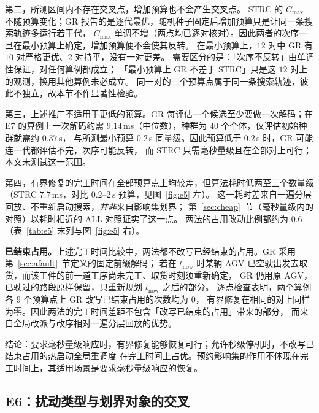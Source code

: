 \documentclass[manuscript,screen,review]{acmart}
\providecommand{\STRC}{\textsc{STRC}}
\newcommand{\MsRepairMed}{7.7}
\newcommand{\RzeroPastLo}{0}
\newcommand{\EfiveCells}{12}        %
\newcommand{\EfiveWinMin}{10}       %
\newcommand{\EfiveTieMin}{2}        %
\newcommand{\MsRedecode}{9.14}       %
\begin{document}
第二，所测区间内不存在交叉点，增加预算也不会产生交叉点。
\STRC{} 的 \(C_{\max}\) 不随预算变化；GR 报告的是逐代最优，随机种子固定后增加预算只是让同一条搜索轨迹多运行若干代，
\(C_{\max}\) 单调不增（两点均已逐对核对）。因此两者的次序一旦在最小预算上确定，增加预算便不会使其反转。
在最小预算上，\(\EfiveCells\) 对中 GR 有 \(\EfiveWinMin\) 对严格更优、\(\EfiveTieMin\) 对持平，没有一对更差。
需要区分的是：「次序不反转」由单调性保证，对任何算例都成立；
「最小预算上 GR 不差于 \STRC{}」只是这 \(\EfiveCells\) 对上的观测，换用其他算例未必成立。
同一对的三个预算点属于同一条搜索轨迹，彼此不独立，故本节不作显著性检验。

第三，上述推广不适用于更低的预算。GR 每评估一个候选至少要做一次解码；在 E7 的算例上一次解码约需
\(\MsRedecode\)\,ms（中位数），种群为 \(40\) 个个体，仅评估初始种群就需约 \(0.37\)\,s，
与所测最小预算 \(0.2\)\,s 同量级。因此预算低于 \(0.2\)\,s 时，GR 可能连一代都评估不完，次序可能反转，
而 \STRC{} 只需毫秒量级且在全部对上可行；本文未测试这一范围。

第四，有界修复的完工时间在全部预算点上均较差，但算法耗时低两至三个数量级
（\STRC{} \(\MsRepairMed\)\,ms，对比 \(0.2\)--\(2\)\,s 预算，见图~\ref{fig:e5} 左）。
这一耗时差来自一遍分层回放、不重新启动搜索，\emph{并非}来自影响集划界；
第~\ref{sec:cheap}~节（毫秒量级内的对照）以耗时相近的 ALL 对照证实了这一点。
两法的占用改动比例都约为 \(0.6\)（表~\ref{tab:e5} 末列与图~\ref{fig:e5} 右）。

\textbf{已结束占用。}上述完工时间比较中，两法都不改写已经结束的占用。GR 采用第~\ref{sec:afault}~节定义的固定前缀解码；
若在 \(t_{\mathrm{now}}\) 时某辆 AGV 已空驶出发去取货，而该工件的前一道工序尚未完工、取货时刻须重新确定，
GR 仍用原 AGV，已驶过的路段原样保留，只重新规划 \(t_{\mathrm{now}}\) 之后的部分。
逐点检查表明，两个算例各 \(9\) 个预算点上 GR 改写已结束占用的次数均为 \(\RzeroPastLo\)，
有界修复在相同的对上同样为零。因此两法的完工时间差距不包含「改写已结束的占用」带来的部分，
而来自全局改派与改序相对一遍分层回放的优势。

结论：要求毫秒量级响应时，有界修复能够恢复可行；允许秒级停机时，不改写已结束占用的热启动全局重调度
在完工时间上占优。预约影响集的作用不体现在完工时间上，其适用场景是要求毫秒量级响应的恢复。

\subsection{E6：扰动类型与划界对象的交叉}
\label{sec:e6}
\end{document}
